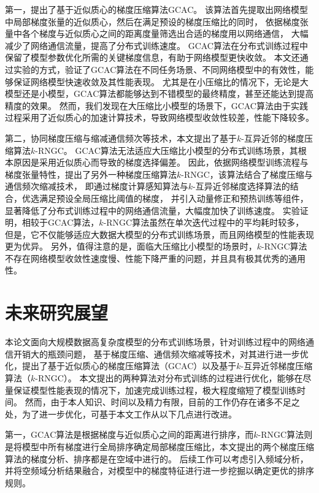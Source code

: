 \documentclass{xdupgthesis}
\begin{document}
第一，提出了基于近似质心的梯度压缩算法GCAC。
该算法首先提取出网络模型中局部梯度张量的近似质心，然后在满足预设的梯度压缩比的同时，
依据梯度张量中各个梯度与近似质心之间的距离度量筛选出合适的梯度用以网络通信，
大幅减少了网络通信流量，提高了分布式训练速度。
GCAC算法在分布式训练过程中保留了模型参数优化所需的关键梯度信息，有助于网络模型更快收敛。
本文还通过实验的方式，验证了GCAC算法在不同任务场景、不同网络模型中的有效性，能够保证网络模型快速收敛及其性能表现。
尤其是在小压缩比的情况下，无论是大模型还是小模型，GCAC算法都能够达到不错模型的最终精度，甚至还能达到提高精度的效果。
然而，我们发现在大压缩比小模型的场景下，GCAC算法由于实践过程采用了近似质心的加速计算技术，导致网络模型收敛性较差，性能下降较多。

第二，协同梯度压缩与缩减通信频次等技术，本文提出了基于$k$-互异近邻的梯度压缩算法$k$-RNGC。
GCAC算法无法适应大压缩比小模型的分布式训练场景，其根本原因是采用近似质心而导致的梯度选择偏差。
因此，依据网络模型训练流程与梯度张量特性，提出了另外一种梯度压缩算法$k$-RNGC，该算法结合了梯度压缩与通信频次缩减技术，
即通过梯度计算感知算法与$k$-互异近邻梯度选择算法的结合，优选满足预设全局压缩比阈值的梯度，
并引入动量修正和预热训练等组件，显著降低了分布式训练过程中的网络通信流量，大幅度加快了训练速度。
实验证明，相较于GCAC算法，$k$-RNGC算法虽然在单次迭代过程中的平均耗时较多，
但是，它不仅能够适应大数据大模型的分布式训练场景，而且网络模型的性能表现更为优异。
另外，值得注意的是，面临大压缩比小模型的场景时，$k$-RNGC算法不存在网络模型收敛性速度慢、性能下降严重的问题，并且具有极其优秀的通用性。


\section{未来研究展望}
本论文面向大规模数据高复杂度模型的分布式训练场景，针对训练过程中的网络通信开销大的瓶颈问题，
基于梯度压缩、通信频次缩减等技术，对其进行进一步优化，提出了基于近似质心的梯度压缩算法（GCAC）以及基于$k$-互异近邻梯度压缩算法（$k$-RNGC）。
本文提出的两种算法对分布式训练的过程进行优化，能够在尽量保证模型性能表现的情况下，加速完成训练过程，极大程度缩短了模型训练时间。
然而，由于本人知识、时间以及精力有限，目前的工作仍存在诸多不足之处，为了进一步优化，可基于本文工作从以下几点进行改进。

第一，GCAC算法是根据梯度与近似质心之间的距离进行排序，而$k$-RNGC算法则是将模型中所有梯度进行全局排序确定局部梯度压缩比，本文提出的两个梯度压缩算法的梯度分析、排序都是在空域中进行的。
后续工作可以考虑引入频域分析，
并将空频域分析结果融合，对模型中的梯度特征进行进一步挖掘以确定更优的排序规则。
\end{document}
